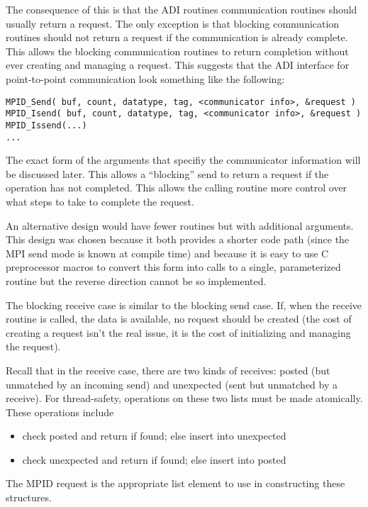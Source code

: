 \documentclass{article}
\begin{document}
The
consequence of this is that the ADI routines communication routines
should usually return a request.  The only exception is that blocking
communication routines should not return a request if the
communication is already complete.  
This allows the blocking communication routines to
return completion without ever creating and managing a request.
This suggests that the ADI interface for point-to-point communication
look something like the following: 
\begin{verbatim}
MPID_Send( buf, count, datatype, tag, <communicator info>, &request )
MPID_Isend( buf, count, datatype, tag, <communicator info>, &request )
MPID_Issend(...)
... 
\end{verbatim}
The exact form of the arguments that specifiy the communicator
information will be discussed later.
This allows a ``blocking'' send to return a request if the operation
has not completed.  This allows the calling routine more control over
what steps to take to complete the request.

An alternative design would have fewer routines but with additional
arguments.  This design was chosen because it both provides a shorter
code path (since the MPI send mode is known at compile time) and
because it is easy to use C preprocessor macros to convert this form
into calls to a single, parameterized routine but the reverse
direction cannot be so implemented.

The blocking receive case is similar to the blocking send case.  If,
when the receive routine is called, the data is available, no request
should be created (the cost of creating a request isn't the real
issue, it is the cost of initializing and managing the request).  

Recall
that in the receive case, there are two kinds of receives: posted (but
unmatched by an incoming send) and unexpected (sent but unmatched by a
receive).  For thread-safety, operations on these two lists must be
made atomically.  These operations include 
\begin{itemize}
\item check posted and return if found; else insert into unexpected
\item check unexpected and return if found; else insert into posted
\end{itemize}
The MPID request is the appropriate list element to use in
constructing these structures.
\end{document}
